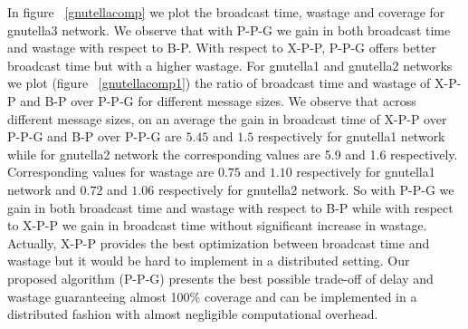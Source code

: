 In figure ~\ref{gnutellacomp} we plot the broadcast time, wastage and coverage for gnutella3 network. 
We observe that with P-P-G we gain in both broadcast time and wastage with respect to B-P. With respect to X-P-P, P-P-G offers better 
broadcast time but with a higher wastage.
For gnutella1 and gnutella2 networks 
we plot (figure ~\ref{gnutellacomp1}) the ratio of broadcast time and wastage of X-P-P and B-P over P-P-G for different message sizes. 
We observe that across different message sizes, on an average the gain in broadcast time of X-P-P over P-P-G and B-P over P-P-G are $5.45$ and $1.5$ respectively for 
gnutella1 network while for gnutella2 network the corresponding values are 5.9 and 1.6 respectively. Corresponding values for wastage are $0.75$ and $1.10$ 
respectively for gnutella1 network and $0.72$ and $1.06$ respectively for gnutella2 network. 
So with P-P-G we gain in both broadcast time and wastage with respect to B-P while with respect to X-P-P 
we gain in broadcast time without significant increase in wastage.
 Actually, X-P-P provides the best optimization between broadcast time and wastage but it would be hard to implement in a 
distributed setting. 
Our proposed algorithm (P-P-G) presents the best possible trade-off of delay and wastage guaranteeing almost 100\% coverage and can be implemented in a distributed fashion with almost negligible computational overhead.
